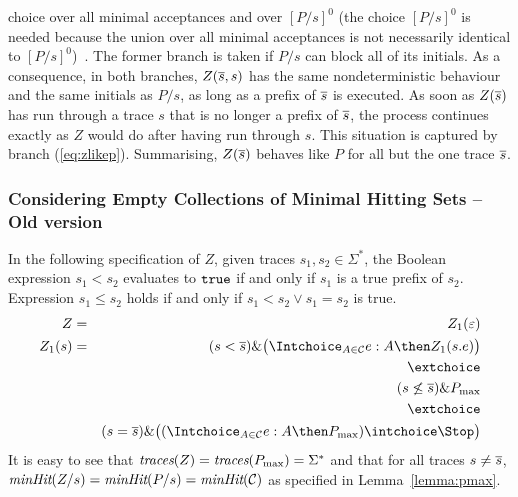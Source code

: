 choice over all minimal acceptances and over $[P/s]^0$ (the choice $[P/s]^0$ is needed
because the union over all minimal acceptances is not necessarily identical 
to $[P/s]^0$)~\cite[pp.~277]{Roscoe:1997:TPC:550448}. 
The former branch is taken if $P/s$ can block all of its initials.
As a consequence, in both branches, $Z(\overline s,s)$ 
has the same nondeterministic behaviour and the same initials as $P/s$, as long as
a prefix of $\overline s$ is executed. As soon as $Z(\overline s)$ has run through a trace $s$ that is no longer a prefix of $\overline s$, 
the process continues exactly as $Z$ would do after having run through $s$. This situation
is captured by branch (\ref{eq:zlikep}).
Summarising, $Z(\overline s)$ behaves like $P$ for all but the
one trace   $\overline s$.



\subsubsection*{Considering Empty Collections of Minimal Hitting Sets -- Old version} 


In the following specification of $Z$, given traces $s_1,s_2\in\Sigma^*$, the Boolean 
expression $ s_1 < s_2$ evaluates to $\mbox{{\tt true}}$ if and only if $s_1$ is a true prefix of $s_2$. Expression $s_1\le s_2$ holds if and only if $ s_1 < s_2 \vee s_1 = s_2$ is true.
\begin{eqnarray*}
Z & = & Z_1(\varepsilon)
\\
Z_1(s) & = & (s < \ol s)\&\big( \Intchoice_{A\in{\cal C}} e:A\then Z_1(s.e)  \big)
\\ & & \extchoice
\\ & & (s \not\le \ol s) \& \pmax
\\ & & \extchoice
\\ & & (s = \ol s) \& \big( (\Intchoice_{A\in{\cal C}} e:A\then \pmax)  
\intchoice \Stop\big)
\end{eqnarray*}
%
It is easy to see that $\text{\it traces}(Z) = \text{\it traces}(P_\text{max}) =\Sigma^*$ and that for all 
traces $s\neq\overline s$, $\text{\it minHit}(Z/s) = \text{\it minHit}(P/s) = \text{\it minHit}({\cal C})$ as specified
in Lemma~\ref{lemma:pmax}.

